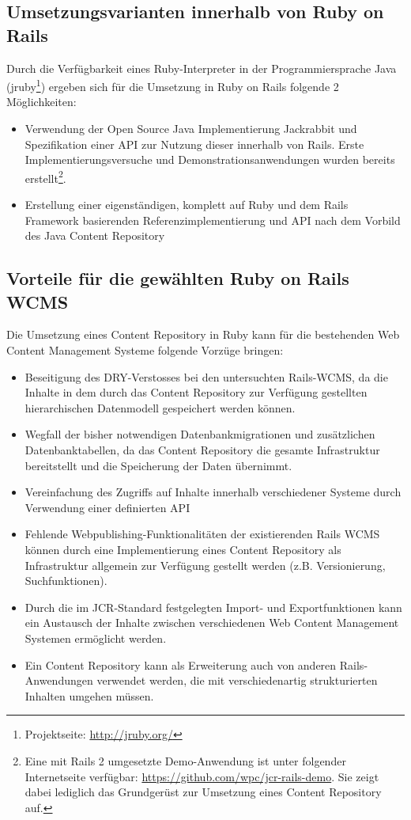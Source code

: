 \subsection{Umsetzungsvarianten innerhalb von Ruby on Rails}

Durch die Verfügbarkeit eines Ruby-Interpreter in der Programmiersprache Java (jruby\footnote{Projektseite: \href{http://jruby.org/}{http://jruby.org/}}) ergeben sich für die Umsetzung in Ruby on Rails folgende 2 Möglichkeiten:

\begin{itemize}
\item
Verwendung der Open Source Java Implementierung Jackrabbit und Spezifikation einer API zur Nutzung dieser innerhalb von Rails. Erste Implementierungsversuche und Demonstrationsanwendungen wurden bereits erstellt\footnote{Eine mit Rails 2 umgesetzte Demo-Anwendung ist unter folgender Internetseite verfügbar: \href{https://github.com/wpc/jcr-rails-demo}{https://github.com/wpc/jcr-rails-demo}. Sie zeigt dabei lediglich das Grundgerüst zur Umsetzung eines Content Repository auf.}.
\item
Erstellung einer eigenständigen, komplett auf Ruby und dem Rails Framework basierenden Referenzimplementierung und API nach dem Vorbild des Java Content Repository
\end{itemize}


\subsection{Vorteile für die gewählten Ruby on Rails WCMS}

Die Umsetzung eines Content Repository in Ruby kann für die bestehenden Web Content Management Systeme folgende Vorzüge bringen:

\begin{itemize}
\item Beseitigung des DRY-Verstosses bei den untersuchten Rails-WCMS, da die Inhalte in dem durch das Content Repository zur Verfügung gestellten hierarchischen Datenmodell gespeichert werden können.
\item
Wegfall der bisher notwendigen Datenbankmigrationen und zusätzlichen Datenbanktabellen, da das Content Repository die gesamte Infrastruktur bereitstellt und die Speicherung der Daten übernimmt.
\item Vereinfachung des Zugriffs auf Inhalte innerhalb verschiedener Systeme durch Verwendung einer definierten API
\item Fehlende Webpublishing-Funktionalitäten der existierenden Rails WCMS können durch eine Implementierung eines Content Repository als Infrastruktur allgemein zur Verfügung gestellt werden (z.B. Versionierung, Suchfunktionen).
\item Durch die im JCR-Standard festgelegten Import- und Exportfunktionen kann ein Austausch der Inhalte zwischen verschiedenen Web Content Management Systemen ermöglicht werden.
\item Ein Content Repository kann als Erweiterung auch von anderen Rails-Anwendungen verwendet werden, die mit verschiedenartig strukturierten Inhalten umgehen müssen.
\end{itemize}



